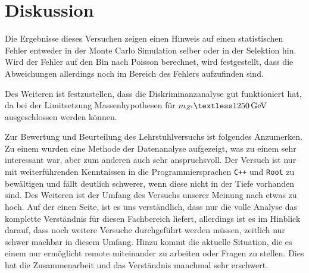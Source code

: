 \section{Diskussion}

Die Ergebnisse dieses Versuchen zeigen einen Hinweis auf einen statistischen Fehler
entweder in der Monte Carlo Simulation selber oder in der Selektion hin. Wird der 
Fehler auf den Bin nach Poisson berechnet, wird festgestellt, dass die Abweichungen 
allerdings noch im Bereich des Fehlers aufzufinden sind. \par

Des Weiteren ist festzustellen, dass die Diskriminanzanalyse gut funktioniert hat, 
da bei der Limitsetzung Massenhypothesen für $m_{Z^\prime} \textless \SI{1250}{\giga\electronvolt}$ 
ausgeschlossen werden können. \par

Zur Bewertung und Beurteilung des Lehrstuhlversuchs ist folgendes Anzumerken. Zu einem
wurden eine Methode der Datenanalyse aufgezeigt, was zu einem sehr interessant war, aber
zum anderen auch sehr anspruchsvoll. Der Versuch ist nur mit weiterführenden Kenntnissen
in die Programmiersprachen \texttt{C++} und \texttt{Root} zu bewältigen und fällt deutlich
schwerer, wenn diese nicht in der Tiefe vorhanden sind. Des Weiteren ist der Umfang des
Versuchs unserer Meinung nach etwas zu hoch. Auf der einen Seite, ist es uns verständlich,
dass nur die volle Analyse das komplette Verständnis für diesen Fachbereich liefert,
allerdings ist es im Hinblick darauf, dass noch weitere Versuche durchgeführt werden
müssen, zeitlich nur schwer machbar in diesem Umfang.
Hinzu kommt die aktuelle Situation, die es einem nur ermöglicht remote miteinander zu arbeiten oder Fragen zu stellen.
Dies hat die Zusammenarbeit und das Verständnis manchmal sehr erschwert.
